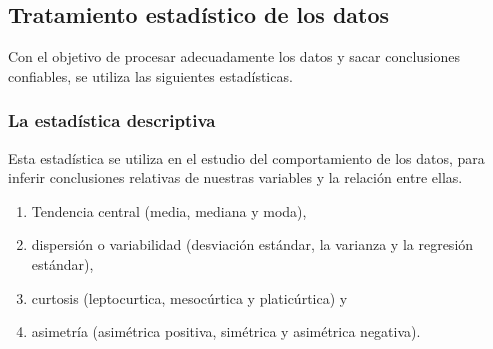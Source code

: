 \documentclass[12pt,a4paper]{article}
\begin{document}
%
%
%
%
%
%
%

\subsection{Tratamiento estadístico de los datos}
Con el objetivo de procesar adecuadamente los datos y sacar conclusiones confiables, se utiliza  las siguientes estadísticas.
 
\subsubsection{La estadística descriptiva} Esta estadística se utiliza en el estudio  del comportamiento de los datos, para inferir conclusiones relativas de nuestras variables y la relación entre ellas.  
\begin{enumerate}
\item Tendencia central (media, mediana y moda),
\item dispersión o variabilidad (desviación estándar, la varianza y la regresión estándar),
\item curtosis (leptocurtica, mesocúrtica y platicúrtica) y 
\item asimetría (asimétrica positiva, simétrica y asimétrica negativa).
\end{enumerate}
\end{document}
